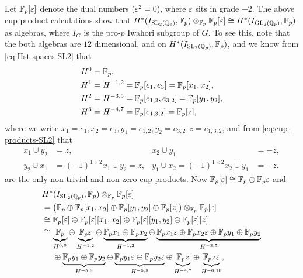 \begin{remark}\label{rem:GL2-SL2-coh-iso}
  Let $\mathbb{F}_{p}[\varepsilon]$ denote the dual numbers ($\varepsilon^{2} = 0$), where $\varepsilon$ sits in grade $-2$. The above cup product calculations show that $H^{*}(I_{\operatorname{SL}_{2}(\mathbb{Q}_{p})}, \mathbb{F}_{p}) \otimes_{\mathbb{F}_{p}} \mathbb{F}_{p}[\varepsilon] \cong H^{*}(I_{\operatorname{GL}_{2}(\mathbb{Q}_{p})},\mathbb{F}_{p})$ as algebras, where $I_{G}$ is the pro-$p$ Iwahori subgroup of $G$. To see this, note that the both algebras are $12$ dimensional, and on $H^{*}(I_{\operatorname{SL}_{2}(\mathbb{Q}_{p})}, \mathbb{F}_{p})$, and we know from \eqref{eq:Hst-spaces-SL2} that
  \begin{align*}
    H^{0} &= \mathbb{F}_{p}, \\
    H^{1} &= H^{-1,2} = \mathbb{F}_{p}[e_{1},e_{3}] = \mathbb{F}_{p}[x_{1},x_{2}], \\
    H^{2} &= H^{-3,5} = \mathbb{F}_{p}[e_{1,2},e_{3,2}] = \mathbb{F}_{p}[y_{1},y_{2}], \\
    H^{3} &= H^{-4,7} = \mathbb{F}_{p}[e_{1,3,2}] = \mathbb{F}_{p}[z],
  \end{align*}
  where we write $x_{1}=e_{1}, x_{2}=e_{3}, y_{1} = e_{1,2}, y_{2} = e_{3,2}, z = e_{1,3,2}$, and from \eqref{eq:cup-products-SL2} that
  \begin{align*}
    x_{1} \cup y_{2} &= z, & x_{2} \cup y_{1} &= -z, \\
    y_{2} \cup x_{1} &= (-1)^{1\times2}x_{1} \cup y_{2} = z, & y_{1} \cup x_{2} = (-1)^{1\times2}x_{2} \cup y_{1} &= -z.
  \end{align*}
  are the only non-trivial and non-zero cup products. Now $\mathbb{F}_{p}[\varepsilon] \cong \mathbb{F}_{p} \oplus \mathbb{F}_{p}\varepsilon$ and
  \begin{align*}
    &H^{*}(I_{\SL_{2}(\Q_{p})},\F_{p}) \otimes_{\F_{p}} \F_{p}[\varepsilon] \\
    &= \bigl( \F_{p} \oplus \F_{p}[x_{1},x_{2}] \oplus \F_{p}[y_{1},y_{2}] \oplus \F_{p}[z] \bigr) \otimes_{\F_{p}} \F_{p}[\varepsilon] \\
    &\iso \F_{p}[\varepsilon] \oplus \F_{p}[\varepsilon][x_{1},x_{2}] \oplus \F_{p}[\varepsilon][y_{1},y_{2}] \oplus \F_{p}[\varepsilon][z] \\
    &\iso \underbrace{\F_{p}}_{H^{0,0}} \oplus \underbrace{\F_{p}\varepsilon}_{H^{-1,2}} \oplus \underbrace{\F_{p}x_{1} \oplus \F_{p}x_{2}}_{H^{-1,2}} \oplus \underbrace{\F_{p}x_{1}\varepsilon \oplus \F_{p}x_{2}\varepsilon \oplus \F_{p}y_{1} \oplus \F_{p}y_{2}}_{H^{-3,5}} \\*
    &\phantom{{}={}} \oplus \underbrace{\F_{p}y_{1} \oplus \F_{p}y_{2}}_{H^{-5,8}} \oplus \underbrace{\F_{p}y_{1}\varepsilon \oplus \F_{p}y_{2}\varepsilon}_{H^{-5,8}} \oplus \underbrace{\F_{p}z}_{H^{-4,7}} \oplus \underbrace{\F_{p}z\varepsilon}_{H^{-6,10}},

\end{align*}
\end{remark}
